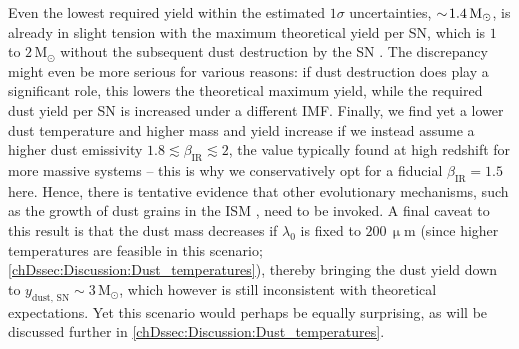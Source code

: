 Even the lowest required yield within the estimated $1 \sigma$ uncertainties, $\sim \! 1.4 \, \mathrm{M_\odot}$, is already in slight tension with the maximum theoretical yield per SN, which is $1$ to $2 \, \mathrm{M_\odot}$ without the subsequent dust destruction by the SN \citep[e.g.][]{2003ApJ...598..785N}. The discrepancy might even be more serious for various reasons: if dust destruction does play a significant role, this lowers the theoretical maximum yield, while the required dust yield per SN is increased under a different IMF. Finally, we find yet a lower dust temperature and higher mass and yield increase if we instead assume a higher dust emissivity $1.8 \lesssim \beta_\text{IR} \lesssim 2$, the value typically found at high redshift for more massive systems \citep[e.g.][]{2020MNRAS.498.4109J, 2020A&A...634L..14C, 2020MNRAS.498.4192F, 2021ApJ...923..215C} -- this is why we conservatively opt for a fiducial $\beta_\text{IR} = 1.5$ here. Hence, there is tentative evidence that other evolutionary mechanisms, such as the growth of dust grains in the ISM \citep{2019A&A...624L..13L}, need to be invoked. A final caveat to this result is that the dust mass decreases if $\lambda_0$ is fixed to $200 \, \mathrm{\upmu m}$ (since higher temperatures are feasible in this scenario; \cref{chDssec:Discussion:Dust_temperatures}), thereby bringing the dust yield down to $y_\text{dust, SN} \sim 3 \, \mathrm{M_\odot}$, which however is still inconsistent with theoretical expectations. Yet this scenario would perhaps be equally surprising, as will be discussed further in \cref{chDssec:Discussion:Dust_temperatures}.
